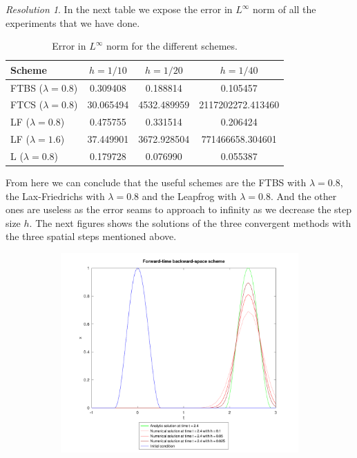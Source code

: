 \documentclass[10pt,a4paper]{article}
\theoremstyle{definition}
\theoremstyle{remark}
\newtheorem*{res}{Resolution}
\begin{document}
\begin{res}
  In the next table we expose the error in $L^\infty$ norm of all the experiments that we have done.
  \begin{table}[ht]
    \centering
    \begin{tabular}{l|c|c|c}
      Scheme               & $h=1/10$  & $h=1/20$    & $h=1/40$          \\
      \hline\hline
      FTBS ($\lambda=0.8$) & 0.309408  & 0.188814    & 0.105457          \\
      FTCS ($\lambda=0.8$) & 30.065494 & 4532.489959 & 2117202272.413460 \\
      LF ($\lambda=0.8$)   & 0.475755  & 0.331514    & 0.206424          \\
      LF ($\lambda=1.6$)   & 37.449901 & 3672.928504 & 771466658.304601  \\
      L ($\lambda=0.8$)    & 0.179728  & 0.076990    & 0.055387
    \end{tabular}
    \caption{Error in $L^\infty$ norm for the different schemes.}
  \end{table}
  From here we can conclude that the useful schemes are the FTBS with $\lambda=0.8$, the Lax-Friedrichs with $\lambda=0.8$ and the Leapfrog with $\lambda=0.8$. And the other ones are useless as the error seams to approach to infinity as we decrease the step size $h$. The next figures shows the solutions of the three convergent methods with the three spatial steps mentioned above.
  \begin{figure}[ht]
    \centering
    \begin{subfigure}{0.49\textwidth}
      \centering
      \includegraphics[width=\textwidth]{Images/ftbs.pdf}

\end{subfigure}
\end{figure}
\end{res}
\end{document}
